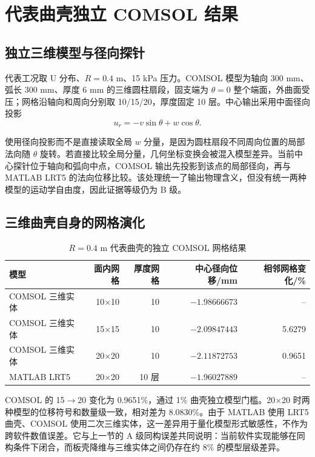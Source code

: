 \documentclass[UTF8,fontset=windows,11pt,a4paper]{ctexart}
\begin{document}
\section{代表曲壳独立 COMSOL 结果}

\subsection{独立三维模型与径向探针}

代表工况取 U 分布、$R=0.4$ m、15 kPa 压力。COMSOL 模型为轴向 300 mm、弧长 300 mm、厚度 6 mm 的三维圆柱扇段，固支端为 $\theta=0$ 整个端面，外曲面受压；网格沿轴向和周向分别取 10/15/20，厚度固定 10 层。中心输出采用中面径向投影
\[
u_r=-v\sin\theta+w\cos\theta.
\]

使用径向投影而不是直接读取全局 $w$ 分量，是因为圆柱扇段不同周向位置的局部法向随 $\theta$ 旋转。若直接比较全局分量，几何坐标变换会被混入模型差异。当前中心探针位于轴向和弧向中点，COMSOL 输出先投影到该点的局部径向，再与 MATLAB LRT5 的法向位移比较。该处理统一了输出物理含义，但没有统一两种模型的运动学自由度，因此证据等级仍为 B 级。

\subsection{三维曲壳自身的网格演化}

\begin{table}[H]
\centering
\caption{$R=0.4$ m 代表曲壳的独立 COMSOL 网格结果}
\label{tab:curved_comsol_mesh}
\begin{tabular}{lrrrr}
\toprule
模型 & 面内网格 & 厚度网格 & 中心径向位移/mm & 相邻网格变化/\% \\
\midrule
COMSOL 三维实体 & 10$\times$10 & 10 & $-1.98666673$ & -- \\
COMSOL 三维实体 & 15$\times$15 & 10 & $-2.09847443$ & 5.6279 \\
COMSOL 三维实体 & 20$\times$20 & 10 & $-2.11872753$ & 0.9651 \\
MATLAB LRT5 & 20$\times$20 & 10 层 & $-1.96027889$ & -- \\
\bottomrule
\end{tabular}
\end{table}

COMSOL 的 15$\rightarrow$20 变化为 0.9651\%，通过 1\% 曲壳独立模型门槛。20$\times$20 时两种模型的位移符号和数量级一致，相对差为 8.0830\%。由于 MATLAB 使用 LRT5 曲壳、COMSOL 使用二次三维实体，这一差异用于量化模型形式敏感性，不作为跨软件数值误差。它与上一节的 A 级同构误差共同说明：当前软件实现能够在同构条件下闭合，而板壳降维与三维实体之间仍存在约 8\% 的模型层级差异。
\end{document}
